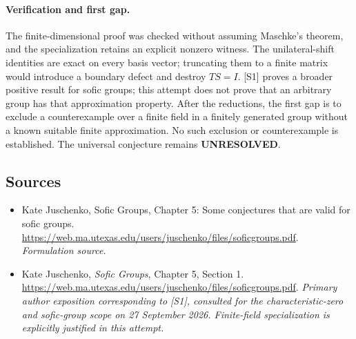 \documentclass[11pt]{article}
\begin{document}
\paragraph{Verification and first gap.}
The finite-dimensional proof was checked without assuming Maschke's
theorem, and the specialization retains an explicit nonzero witness.
The unilateral-shift identities are exact on every basis vector;
truncating them to a finite matrix would introduce a boundary defect
and destroy $TS=I$. [S1] proves a broader positive result for sofic
groups; this attempt does not prove that an arbitrary group has that
approximation property. After the reductions, the first gap is to
exclude a counterexample over a finite field in a finitely generated
group without a known suitable finite approximation. No such exclusion
or counterexample is established. The universal conjecture remains
\textbf{UNRESOLVED}.

\subsection{Sources}
\begin{itemize}
\item[S1]Kate Juschenko, Sofic Groups, Chapter 5: Some conjectures that are valid for sofic groups.
\url{https://web.ma.utexas.edu/users/juschenko/files/soficgroups.pdf}.
\textit{Formulation source.}
\item[E1]Kate Juschenko, \emph{Sofic Groups}, Chapter 5, Section 1.
\url{https://web.ma.utexas.edu/users/juschenko/files/soficgroups.pdf}.
\textit{Primary author exposition corresponding to [S1], consulted for
the characteristic-zero and sofic-group scope on 27 September 2026.
Finite-field specialization is explicitly justified in this attempt.}

\end{itemize}
\end{document}
